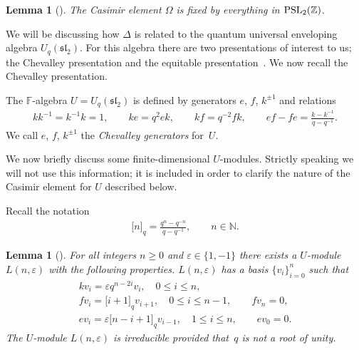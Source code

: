 \documentclass[pdftex]{sigma}
\numberwithin{equation}{section}
\newtheorem{Lemma}[Theorem]{Lemma}
\begin{document}
\begin{Lemma}[]
\label{lem:psl}
The Casimir element $\Omega$  is fixed by
everything in
${\rm  {PSL}}_2(\mathbb Z)$.
\end{Lemma}

We will be discussing how
$\Delta$ is related to the
quantum universal enveloping
algebra $U_q(\mathfrak{sl}_2)$.
For
this algebra
there are two presentations of
 interest to us;
 the Chevalley presentation
\cite[Section~1.1]{jantzen}
and the equitable presentation~\cite{equit}. We now recall the
  Chevalley presentation.


\begin{Definition}
\label{def:chev}
The
$\mathbb F$-algebra $U=U_q(\mathfrak{sl}_2)$
is def\/ined by generators
$e$, $f$, $k^{\pm 1 }$  and relations
\begin{gather*}
  k k^{-1} = k^{-1} k = 1,
\qquad
 ke = q^2 e k,
\qquad
 kf = q^{-2} f k,
\qquad ef-fe = \frac{k-k^{-1}}{q-q^{-1}}.
\end{gather*}
We call  $e$, $f$, $k^{\pm 1}$ the {\it Chevalley generators} for~$U$.
\end{Definition}

 We now brief\/ly discuss some
f\/inite-dimensional $U$-modules. Strictly speaking
we will not use this information; it is included
in order to clarify the nature of the Casimir element
for $U$ described below.

Recall the notation
\begin{gather*}
  \lbrack  n \rbrack_q=\frac{q^n-q^{-n}}{q-q^{-1}},
  \qquad n \in \mathbb N.
\end{gather*}

\begin{Lemma}[]
For all integers $n\geq 0$ and $\varepsilon \in \lbrace 1,-1\rbrace$
there exists a
$U$-module
$L(n,\varepsilon)$ with the following properties.
$L(n,\varepsilon)$ has a basis
$\lbrace v_i\rbrace_{i=0}^n$
such that
\begin{gather*}
k v_i  =  \varepsilon q^{n-2i} v_i, \quad  0 \leq i \leq n,
\\
f v_i = \lbrack i+1 \rbrack_q v_{i+1}, \quad 0 \leq i \leq n-1,
\qquad fv_n =0,
\\
e v_i = \varepsilon
\lbrack n-i+1 \rbrack_q v_{i-1}, \quad 1 \leq i \leq n,
\qquad ev_0 =0.
\end{gather*}
The
$U$-module
$L(n,\varepsilon)$ is irreducible provided that~$q$ is not a root of unity.
\end{Lemma}
\end{document}
